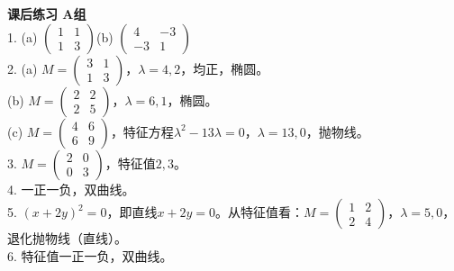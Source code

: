 \noindent\textbf{课后练习 A组}\\
1. (a) $\begin{pmatrix}1&1\\1&3\end{pmatrix}$\quad (b) $\begin{pmatrix}4&-3\\-3&1\end{pmatrix}$\\
2. (a) $M=\begin{pmatrix}3&1\\1&3\end{pmatrix}$，$\lambda=4,2$，均正，椭圆。\\
(b) $M=\begin{pmatrix}2&2\\2&5\end{pmatrix}$，$\lambda=6,1$，椭圆。\\
(c) $M=\begin{pmatrix}4&6\\6&9\end{pmatrix}$，特征方程$\lambda^2-13\lambda=0$，$\lambda=13,0$，抛物线。\\
3. $M=\begin{pmatrix}2&0\\0&3\end{pmatrix}$，特征值$2,3$。\\
4. 一正一负，双曲线。\\
5. $(x+2y)^2=0$，即直线$x+2y=0$。从特征值看：$M=\begin{pmatrix}1&2\\2&4\end{pmatrix}$，$\lambda=5,0$，退化抛物线（直线）。\\
6. 特征值一正一负，双曲线。\\

